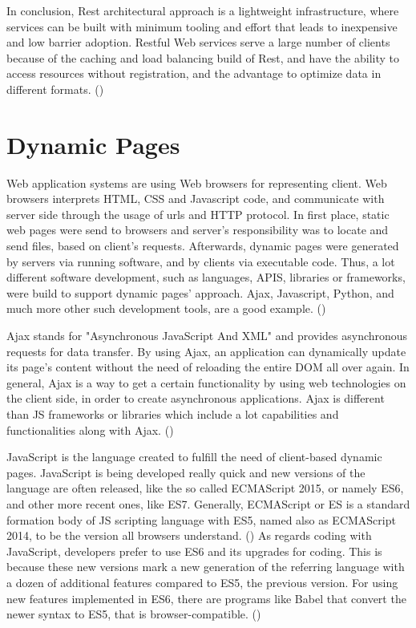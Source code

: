 In conclusion, Rest architectural approach is a lightweight infrastructure, where services can be built with minimum tooling and effort that leads to inexpensive and low barrier adoption. Restful Web services serve a large number of clients because of the caching and load balancing build of Rest, and have the ability to access resources without registration, and the advantage to optimize data in different formats. (\cite{Reference8}) \par

\section{Dynamic Pages}

Web application systems are using Web browsers for representing client. Web browsers interprets HTML, CSS and Javascript code, and communicate with server side through the usage of urls and HTTP protocol. In first place, static web pages were send to browsers and server's responsibility was to locate and send files, based on client's requests. Afterwards, dynamic pages were generated by servers via running software, and by clients via executable code. Thus, a lot different software development, such as languages, APIS, libraries or frameworks, were build to support dynamic pages' approach. Ajax, Javascript, Python, and much more other such development tools, are a good example. (\cite{Reference4}) \par

Ajax stands for "Asynchronous JavaScript And XML" and provides asynchronous requests for data transfer. By using Ajax, an application can dynamically update its page's content without the need of reloading the entire DOM all over again. In general, Ajax is a way to get a certain functionality by using web technologies on the client side, in order to create asynchronous applications. Ajax is different than JS frameworks or libraries which include a lot capabilities and functionalities along with Ajax. (\cite{Reference17}) \par

JavaScript is the language created to fulfill the need of client-based dynamic pages. JavaScript is being developed really quick and new versions of the language are often released, like the so called ECMAScript 2015, or namely ES6, and other more recent ones, like ES7. Generally, ECMAScript or ES is a standard formation body of JS scripting language with ES5, named also as ECMAScript 2014, to be the version all browsers understand. (\cite{Reference10}) As regards coding with JavaScript, developers prefer to use ES6 and its upgrades for coding. This is because these new versions mark a new generation of the referring language with a dozen of additional features compared to ES5, the previous version. For using new features implemented in ES6, there are programs like Babel that convert the newer syntax to ES5, that is browser-compatible. (\cite{Reference13}) \par

